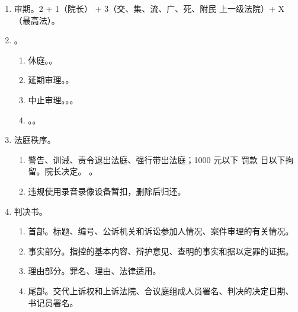 \begin{enumerate}
\begin{enumerate}
\begin{enumerate}
\begin{enumerate}
                          \item {}。
                        \end{enumerate}
                  \item {}。干了但无责任年龄 \hz 无责任能力。。
                        。
                \end{enumerate}
          \item 审期。2 + 1（院长） + 3（交、集、流、广、死、附民 \yjt 上一级法院）+ X（最高法）。
          \item {}。
                \begin{enumerate}
                  \item 休庭。。
                  \item 延期审理。。
                  \item 中止审理。。。
                  \item {}。。
                \end{enumerate}
          \item 法庭秩序。
                \begin{enumerate}
                  \item 警告、训诫、责令退出法庭、强行带出法庭；1000 元以下 罚款  日以下拘留。院长决定。
                        。
                  \item 违规使用录音录像设备暂扣，删除后归还。
                \end{enumerate}
          \item 判决书。
                \begin{enumerate}
                  \item 首部。标题、编号、公诉机关和诉讼参加人情况、案件审理的有关情况。
                  \item 事实部分。指控的基本内容、辩护意见、查明的事实和据以定罪的证据。
                  \item 理由部分。罪名、理由、法律适用。
                  \item 尾部。交代上诉权和上诉法院、合议庭组成人员署名、判决的决定日期、书记员署名。
                \end{enumerate}

\end{enumerate}
\end{enumerate}
